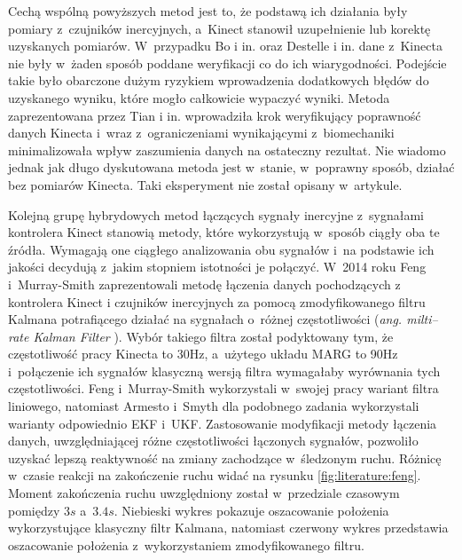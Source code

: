 Cechą wspólną powyższych metod jest to, że podstawą ich działania były pomiary z~czujników inercyjnych, a~Kinect stanowił uzupełnienie lub korektę uzyskanych pomiarów. W~przypadku Bo i in. oraz Destelle i in. dane z~Kinecta nie były w~żaden sposób poddane weryfikacji co do ich wiarygodności. Podejście takie było obarczone dużym ryzykiem wprowadzenia dodatkowych błędów do uzyskanego wyniku, które mogło całkowicie wypaczyć wyniki. Metoda zaprezentowana przez Tian i in. wprowadziła krok weryfikujący poprawność danych Kinecta i~wraz z~ograniczeniami wynikającymi z~biomechaniki minimalizowała wpływ zaszumienia danych na ostateczny rezultat. Nie wiadomo jednak jak długo dyskutowana metoda jest w~stanie, w~poprawny sposób, działać bez pomiarów Kinecta. Taki eksperyment nie został opisany w~artykule.

Kolejną grupę hybrydowych metod łączących sygnały inercyjne z~sygnałami kontrolera Kinect stanowią metody, które wykorzystują w~sposób ciągły oba te źródła. Wymagają one ciągłego analizowania obu sygnałów i~na podstawie ich jakości decydują z~jakim stopniem istotności je połączyć. W~2014 roku Feng i~Murray-Smith \cite{Murray-Smith2014} zaprezentowali metodę łączenia danych pochodzących z kontrolera Kinect i czujników inercyjnych za pomocą zmodyfikowanego filtru Kalmana potrafiącego działać na sygnałach o~różnej częstotliwości (\emph{ang. milti--rate Kalman Filter} \cite{Dhuli2009}). Wybór takiego filtra został podyktowany tym, że częstotliwość pracy Kinecta to 30Hz, a~użytego układu MARG to 90Hz i~połączenie ich sygnałów klasyczną wersją filtra wymagałaby wyrównania tych częstotliwości. Feng i~Murray-Smith wykorzystali w~swojej pracy wariant filtra liniowego, natomiast Armesto i~Smyth dla podobnego zadania wykorzystali warianty odpowiednio EKF\cite{Armesto01062007} i~UKF\cite{Smyth2007}. Zastosowanie modyfikacji metody łączenia danych, uwzględniającej różne częstotliwości łączonych sygnałów, pozwoliło uzyskać lepszą reaktywność na zmiany zachodzące w~śledzonym ruchu. Różnicę w~czasie reakcji na zakończenie ruchu widać na rysunku \ref{fig:literature:feng}. Moment zakończenia ruchu uwzględniony został w~przedziale czasowym pomiędzy $3s$ a~$3.4s$. Niebieski wykres pokazuje oszacowanie położenia wykorzystujące klasyczny filtr Kalmana, natomiast czerwony wykres przedstawia oszacowanie położenia z~wykorzystaniem zmodyfikowanego filtru.


